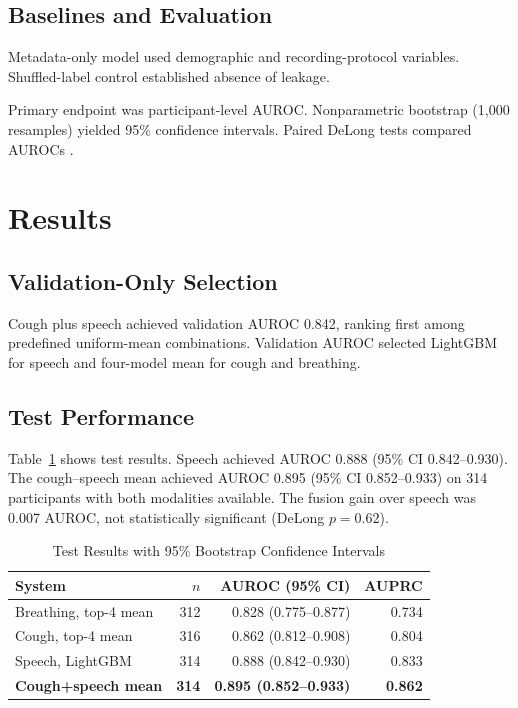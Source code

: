 \documentclass[conference]{IEEEtran}
\begin{document}
\subsection{Baselines and Evaluation}

Metadata-only model used demographic and recording-protocol variables. Shuffled-label control established absence of leakage.

Primary endpoint was participant-level AUROC. Nonparametric bootstrap (1,000 resamples) yielded 95\% confidence intervals. Paired DeLong tests compared AUROCs \cite{delong1988auc}.

\section{Results}

\subsection{Validation-Only Selection}

Cough plus speech achieved validation AUROC 0.842, ranking first among predefined uniform-mean combinations. Validation AUROC selected LightGBM for speech and four-model mean for cough and breathing.

\subsection{Test Performance}

Table~\ref{tab:results} shows test results. Speech achieved AUROC 0.888 (95\% CI 0.842--0.930). The cough--speech mean achieved AUROC 0.895 (95\% CI 0.852--0.933) on 314 participants with both modalities available. The fusion gain over speech was 0.007 AUROC, not statistically significant (DeLong $p=0.62$).

\begin{table}[!t]
\caption{Test Results with 95\% Bootstrap Confidence Intervals}
\label{tab:results}
\centering
\footnotesize
\begin{tabular}{lrrr}
\toprule
System & $n$ & AUROC (95\% CI) & AUPRC \\
\midrule
Breathing, top-4 mean & 312 & 0.828 (0.775--0.877) & 0.734 \\
Cough, top-4 mean     & 316 & 0.862 (0.812--0.908) & 0.804 \\
Speech, LightGBM      & 314 & 0.888 (0.842--0.930) & 0.833 \\
\midrule
\textbf{Cough+speech mean} & \textbf{314} & \textbf{0.895 (0.852--0.933)} & \textbf{0.862} \\
\bottomrule
\end{tabular}
\end{table}
\end{document}
